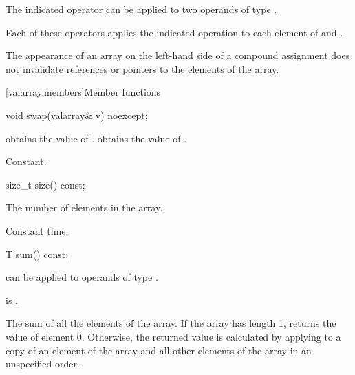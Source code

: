 \begin{itemdescr}
\pnum
\mandates
The indicated operator can be applied to two operands of type .

\pnum
\effects
Each of these operators applies the indicated operation to each element
of  and .

\pnum
\returns
{}

\pnum
\remarks
The appearance of an array on the left-hand side of a compound assignment
does not
invalidate references or pointers to the elements of the array.
\end{itemdescr}

[valarray.members]{Member functions}

%
\begin{itemdecl}
void swap(valarray& v) noexcept;
\end{itemdecl}

\begin{itemdescr}
\pnum
\effects
{} obtains the value of
.  obtains the value of .

\pnum
\complexity
Constant.
\end{itemdescr}

%
\begin{itemdecl}
size_t size() const;
\end{itemdecl}

\begin{itemdescr}
\pnum
\returns
The number of elements in the array.

\pnum
\complexity
Constant time.
\end{itemdescr}

%
\begin{itemdecl}
T sum() const;
\end{itemdecl}

\begin{itemdescr}
\pnum
\mandates
{} can be applied to operands of type .

\pnum
\expects
{} is .

\pnum
\returns
The sum of all the elements of the array.
If the array has length 1, returns the value of element 0.
Otherwise, the returned value is calculated by applying
to a copy of an element of the array and
all other elements of the array in an unspecified order.%
\end{itemdescr}

